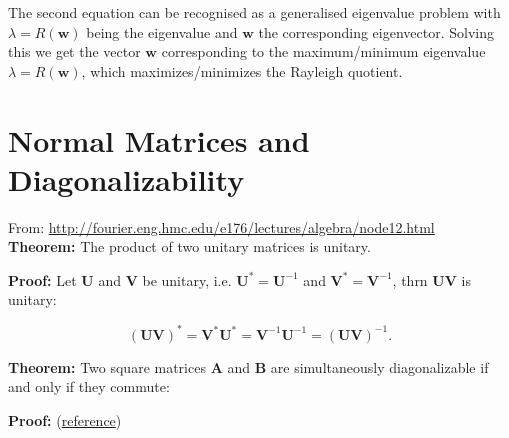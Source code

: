\documentclass[10pt,b5paper,titlepage]{book}
\begin{document}
The second equation can be recognised as a generalised eigenvalue problem with
$\lambda = R(\mathbf{w})$ being the eigenvalue and $\mathbf{w}$ the corresponding
eigenvector. Solving this we get the vector $\mathbf{w}$ corresponding to the
maximum/minimum eigenvalue $\lambda = R(\mathbf{w})$, which maximizes/minimizes
the Rayleigh quotient.


\chapter{Normal Matrices and Diagonalizability}

From: \url{http://fourier.eng.hmc.edu/e176/lectures/algebra/node12.html}\\

\textbf{Theorem:} The product of two unitary matrices is unitary.

\textbf{Proof:} Let $\mathbf{U}$ and $\mathbf{V}$ be unitary, i.e.
$\mathbf{U}^{*} = \mathbf{U}^{-1}$ and $\mathbf{V}^{*} = \mathbf{V}^{-1}$,
thrn $\mathbf{U}\mathbf{V}$ is unitary:

\begin{equation}
    (\mathbf{U}\mathbf{V})^{*} = \mathbf{V}^{*}\mathbf{U}^{*}
    = \mathbf{V}^{-1}\mathbf{U}^{-1} = (\mathbf{U}\mathbf{V})^{-1}
.\end{equation}


\textbf{Theorem:} Two square matrices $\mathbf{A}$ and $\mathbf{B}$ are simultaneously
diagonalizable if and only if they commute:

\textbf{Proof:} (\href{http://math.stackexchange.com/questions/236212/simultaneously-diagonalizable-proof}{reference})
\end{document}
